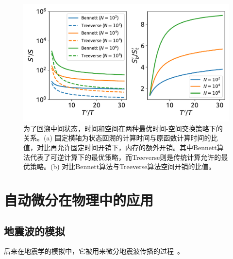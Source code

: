 \documentclass[A4,twoside,fontset=ubuntu,UTF8]{ctexart}
\begin{document}
\begin{figure}[t]
\centering
\includegraphics[width=0.8\columnwidth]{./fig1.pdf}
    \caption{为了回溯中间状态，时间和空间在两种最优时间-空间交换策略下的关系。(a) 固定横轴为状态回溯的计算时间与原函数计算时间的比值，对比再允许固定时间开销下，内存的额外开销。其中Bennett算法代表了可逆计算下的最优策略，而Treeverse则是传统计算允许的最优策略。(b) 对比Bennett算法与Treeverse算法空间开销的比值。\label{fig:timespace}} 
\end{figure}


\section{自动微分在物理中的应用}\label{sec:applications}
\baselineskip
\subsection{地震波的模拟}
后来在地震学的模拟中，它被用来微分地震波传播的过程~\cite{Symes2007}。

\baselineskip
\end{document}
